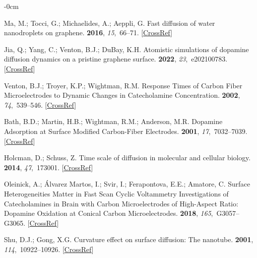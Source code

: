\documentclass[molecules,article,accept,pdftex,moreauthors]{Definitions/mdpi}
\begin{document}
\begin{adjustwidth}{-\extralength}{0cm}
\begin{thebibliography}{999}
Ma, M.; Tocci, G.; Michaelides, A.; Aeppli, G.
\newblock Fast diffusion of water nanodroplets on graphene.
 {\bf 2016}, {\em 15},~66--71. [\href{http://dx.doi.org/10.1038/nmat4449}{CrossRef}]

Jia, Q.; Yang, C.; Venton, B.J.; DuBay, K.H.
\newblock Atomistic simulations of dopamine diffusion dynamics on a pristine
graphene surface.
 {\bf 2022}, {\em 23},~e202100783. [\href{http://dx.doi.org/10.1002/cphc.202100783}{CrossRef}]

Venton, B.J.; Troyer, K.P.; Wightman, R.M.
\newblock Response Times of Carbon Fiber Microelectrodes to Dynamic Changes in
Catecholamine Concentration.
 {\bf 2002}, {\em 74},~539--546. [\href{http://dx.doi.org/10.1021/ac010819a}{CrossRef}]

Bath, B.D.; Martin, H.B.; Wightman, R.M.; Anderson, M.R.
\newblock Dopamine Adsorption at Surface Modified Carbon-Fiber Electrodes.
 {\bf 2001}, {\em 17},~7032--7039. [\href{http://dx.doi.org/10.1021/la0106844}{CrossRef}]

Holcman, D.; Schuss, Z.
\newblock Time scale of diffusion in molecular and cellular biology.
 {\bf 2014},
{\em 47},~173001. [\href{http://dx.doi.org/10.1088/1751-8113/47/17/173001}{CrossRef}]

Oleinick, A.; Álvarez Martos, I.; Svir, I.; Ferapontova, E.E.; Amatore, C.
\newblock Surface Heterogeneities Matter in Fast Scan Cyclic Voltammetry
Investigations of Catecholamines in Brain with Carbon Microelectrodes of
High-Aspect Ratio: Dopamine Oxidation at Conical Carbon Microelectrodes.
 {\bf 2018}, {\em 165},~G3057--G3065. [\href{http://dx.doi.org/10.1149/2.0071812jes}{CrossRef}]

Shu, D.J.; Gong, X.G.
\newblock Curvature effect on surface diffusion: The nanotube.
 {\bf 2001}, {\em 114},~10922--10926. [\href{http://dx.doi.org/10.1063/1.1373644}{CrossRef}]


\end{thebibliography}
\end{adjustwidth}
\end{document}
